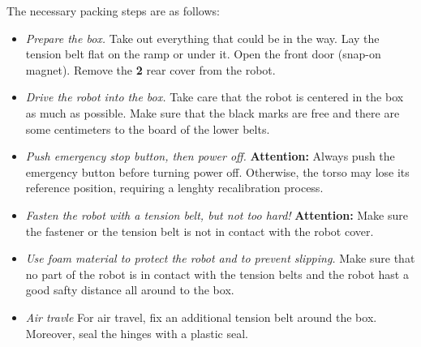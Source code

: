 The necessary packing steps are as follows:
\begin{itemize}
\item {\em Prepare the box.} Take out everything that could be in the way. Lay the tension belt flat on the ramp or under it. Open the front door (snap-on magnet). Remove the {\bf 2} rear cover from the robot.
\item {\em Drive the robot into the box.} Take care that the robot is centered in the box as much as possible. Make sure that the black marks are free and there are some centimeters to the board of the lower belts.
\item {\em Push emergency stop button, then power off.} {\bf Attention:} Always push the emergency button before turning power off. Otherwise, the torso may lose its reference position, requiring a lenghty recalibration process.
\item {\em Fasten the robot with a tension belt, but not too hard!} {\bf Attention:} Make sure the fastener or the tension belt is not in contact with the robot cover. 
\item {\em Use foam material to protect the robot and to prevent slipping.} Make sure that no part of the robot is in contact with the tension belts and the robot hast a good safty distance all around to the box. 
\item {\em Air travle} For air travel, fix an additional tension belt around the box. Moreover, seal the hinges with a plastic seal.
\end{itemize}

\newpage

